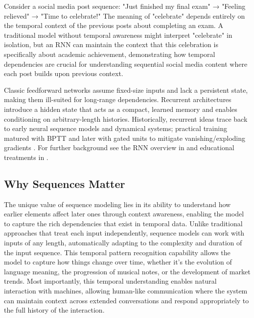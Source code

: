 \begin{example}
Consider a social media post sequence: "Just finished my final exam" → "Feeling relieved" → "Time to celebrate!" The meaning of "celebrate" depends entirely on the temporal context of the previous posts about completing an exam. A traditional model without temporal awareness might interpret "celebrate" in isolation, but an RNN can maintain the context that this celebration is specifically about academic achievement, demonstrating how temporal dependencies are crucial for understanding sequential social media content where each post builds upon previous context.
\end{example}

Classic feedforward networks assume fixed-size inputs and lack a persistent state, making them ill-suited for long-range dependencies. Recurrent architectures introduce a hidden state that acts as a compact, learned memory  and enables conditioning on arbitrary-length histories. Historically, recurrent ideas trace back to early neural sequence models and dynamical systems; practical training matured with BPTT \cite{Rumelhart1986} and later with gated units to mitigate vanishing/exploding gradients \cite{Hochreiter1997}. For further background see the RNN overview in \cite{GoodfellowEtAl2016} and educational treatments in \cite{D2LChapterRNN,WebRNNWikipedia,WebDLBRNN}.


\subsection{Why Sequences Matter}

The unique value of sequence modeling lies in its ability to understand how earlier elements affect later ones through context awareness, enabling the model to capture the rich dependencies that exist in temporal data. Unlike traditional approaches that treat each input independently, sequence models can work with inputs of any length, automatically adapting to the complexity and duration of the input sequence. This temporal pattern recognition capability allows the model to capture how things change over time, whether it's the evolution of language meaning, the progression of musical notes, or the development of market trends. Most importantly, this temporal understanding enables natural interaction with machines, allowing human-like communication where the system can maintain context across extended conversations and respond appropriately to the full history of the interaction.

